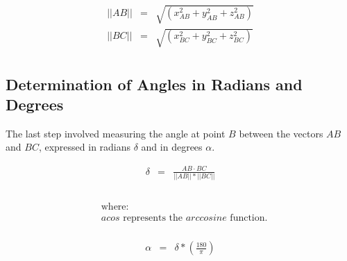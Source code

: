     \begin{equation*}
    \begin{array}{lclclclclcl}
    \displaystyle ||AB|| &=& \sqrt{(x_{AB}^2 + y_{AB}^2 + z_{AB}^2)}\\
    \displaystyle ||BC|| &=& \sqrt{(x_{BC}^2 + y_{BC}^2 + z_{BC}^2)}\\
    \end{array}
    \end{equation*}

\subsection{Determination of Angles in Radians and Degrees}
    \label{annexes:calcul-detours-angles-produit-angle}

The last step involved measuring the angle at point \(B\) between the vectors \(AB\) and \(BC\), expressed in radians \(\delta\) and in degrees \(\alpha\).%

    \begin{equation*}
    \begin{array}{lclcl}
    \displaystyle \delta &=& \displaystyle\frac{AB \cdot BC}{||AB|| * ||BC||}\\\\
    \end{array}
    \end{equation*}

    \begin{align*}
    &\text{where:} \\
    &acos \text{ represents the $arccosine$ function.}\\
    \end{align*}

    \begin{equation*}
    \begin{array}{lclclclclcl}
    \displaystyle \alpha &=& \delta * (\displaystyle\frac{180}{\pi})\\\\
    \end{array}
    \end{equation*}